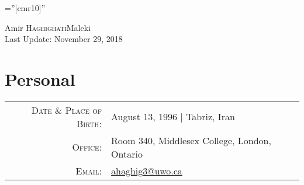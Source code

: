 \documentclass[a4paper,10pt]{article}
\begin{document}
\font\fb=''[cmr10]'' %

\par{\centering
		{\Huge Amir \textsc{Haghighati}Maleki\\
		\small{Last Update: November 29, 2018}
		}
	\bigskip\par
}
\section{Personal}

\begin{tabular}{rl}
    \textsc{Date \& Place of Birth:} & August 13, 1996 | Tabriz, Iran \\
    \textsc{Office:}   & Room 340, Middlesex College, London, Ontario \\
    \textsc{Email:}     & \href{mailto:ahaghig3@uwo.ca}{ahaghig3@uwo.ca} \\
\end{tabular}

\end{document}
